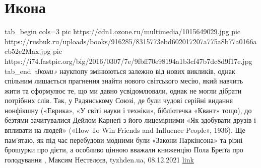  
 
 
 
 
\chapter{Икона}
\label{sec:slova.ikona}

\ifcmt
  tab_begin cols=3
		 pic https://cdn1.ozone.ru/multimedia/1015649029.jpg
     pic https://rusbuk.ru/uploads/books/916285/8315773ebd602017207a775a8b77a0166acb52e2Max.jpg
		 pic https://i74.fastpic.org/big/2016/0307/7e/9fbff70e98194a1b3cf47b7dc8d9f17e.jpg
  tab_end
\fi
\emph{«Ікони»} наукпопу змінюються залежно від нових викликів, однак спільним
лишається прагнення знайти нового світського месію, який навчить жити та
сформулює те, що ми давно усвідомлювали, однак не могли дібрати потрібних слів.
Так, у Радянському Союзі, де були чудові серійні видання нонфікшну («Еврика»,
«У світі науки і техніки», бібліотечка «Квант» тощо), до безтями зачитувалися
Дейлом Карнеґі з його лицемірними «Як здобувати друзів і впливати на людей»
(«How To Win Friends and Influence People», 1936). Ще пам’ятаю, як під час
перебудови модними були «Закони Паркінсона» та різні брошурки про дієти, а
особливо цінною вважали книженцію Пола Бреґґа про голодування
, Максим Нестелєєв, tyzhden.ua, 08.12.2021%
\href{https://tyzhden.ua/Columns/50/253787}{link}
